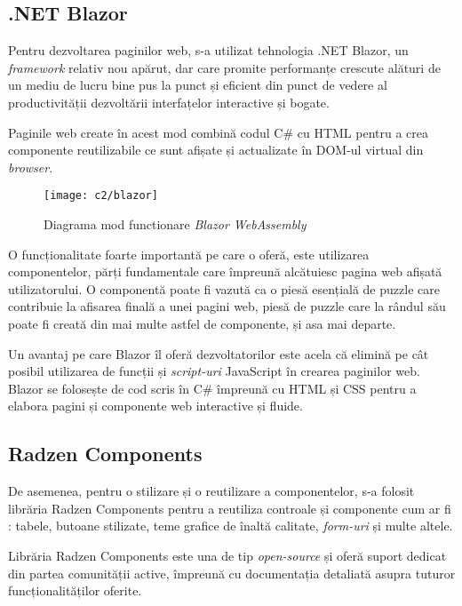 \subsection*{.NET Blazor}
Pentru dezvoltarea paginilor web, s-a utilizat tehnologia .NET Blazor, un \textit{framework} relativ nou apărut, dar care promite performanțe crescute alături de un mediu de lucru bine pus la punct și eficient din punct de vedere al productivității dezvoltării interfațelor interactive și bogate.

Paginile web create în acest mod combină codul C\# cu HTML pentru a crea componente reutilizabile ce sunt  afișate și actualizate în DOM-ul virtual din \textit{browser}.\\

\vspace{1cm}
\begin{figure}[h]
	\centering
	
	\texttt{[image: c2/blazor]}
	\caption{Diagrama mod functionare \textit{Blazor WebAssembly}}
\end{figure}

O funcționalitate foarte importantă pe care o oferă, este utilizarea componentelor, părți fundamentale care împreună alcătuiesc pagina web afișată utilizatorului. O componentă poate fi vazută ca o piesă esențială de puzzle care contribuie la afisarea finală a unei pagini web, piesă de puzzle care la rândul său poate fi creată din mai multe astfel de componente, și asa mai departe.

Un avantaj pe care Blazor îl oferă dezvoltatorilor este acela că elimină pe cât posibil utilizarea de funcții și \textit{script-uri }JavaScript în crearea paginilor web. Blazor se folosește de cod scris în C\# împreună cu HTML și CSS pentru a elabora pagini și componente web interactive și fluide.\\

\subsection*{Radzen Components}
De asemenea, pentru o stilizare și o reutilizare a componentelor, s-a folosit librăria Radzen Components pentru a reutiliza controale și componente cum ar fi : tabele, butoane stilizate, teme grafice de înaltă calitate, \textit{form-uri} și multe altele.

Librăria Radzen Components este una de tip \textit{open-source} și oferă suport dedicat din partea comunității active, împreună cu documentația detaliată asupra tuturor funcționalităților oferite.



